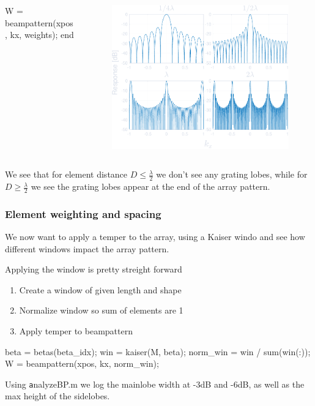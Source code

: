 \documentclass[compress]{beamer}
\begin{document}
\begin{frame}[fragile]
\begin{columns}
\begin{column}{0.52\textwidth}
\begin{jllisting}[gobble=16, language=Matlab]
                    W = beampattern(xpos, kx, weights);
                end
            \end{jllisting}
        \end{column}
        \begin{column}{0.5\textwidth}
            \begin{figure}
                \includegraphics[width=\columnwidth]{"../4.pdf"}
            \end{figure}
        \end{column}
    \end{columns}
    We see that for element distance $D \le \frac{λ}{2}$ we don't see any grating lobes,
    while for $D \ge \frac{λ}{2}$ we see the grating lobes appear at the end of the array
    pattern.
\end{frame}

\begin{frame}[fragile] %
    \frametitle{Element weighting and spacing}
    We now want to apply a temper to the array, using a Kaiser windo and see how
    different windows impact the array pattern.
    
    Applying the window is pretty streight forward
    \begin{enumerate}
        \item Create a window of given length and shape
        \item Normalize window so sum of elements are 1
        \item Apply temper to beampattern
    \end{enumerate}

    \begin{jllisting}[gobble=8,language=Matlab]
        beta = betas(beta_idx);
        win = kaiser(M, beta);
        norm_win = win / sum(win(:));
        W = beampattern(xpos, kx, norm_win);
    \end{jllisting}
    Using {\texttt analyzeBP.m} we log the mainlobe width at -3dB and -6dB, as
    well as the max height of the sidelobes.
\end{frame}
\end{document}
